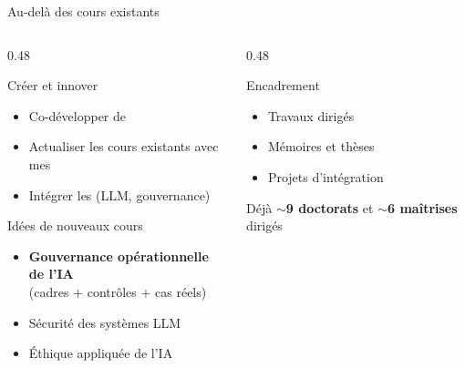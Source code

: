 \documentclass[aspectratio=169,11pt]{beamer}
\begin{document}
\begin{frame}{Au-delà des cours existants}
  \begin{columns}[T]
    \begin{column}{0.48\textwidth}
      \begin{block}{Créer et innover}
        \begin{itemize}
          \item Co-développer de 
          \item Actualiser les cours existants avec mes 
          \item Intégrer les  (LLM, gouvernance)
        \end{itemize}
      \end{block}
      
      \vspace{0.3em}
      
      \begin{exampleblock}{Idées de nouveaux cours}
        \small
        \begin{itemize}
          \item \textbf{Gouvernance opérationnelle de l'IA}\\
                {\scriptsize (cadres + contrôles + cas réels)}
          \item Sécurité des systèmes LLM
          \item Éthique appliquée de l'IA
        \end{itemize}
      \end{exampleblock}
    \end{column}
    \begin{column}{0.48\textwidth}
      \begin{alertblock}{Encadrement}
        \begin{itemize}
          \item Travaux dirigés
          \item Mémoires et thèses
          \item Projets d'intégration
        \end{itemize}
        
        \vspace{0.3em}
        
        {\small Déjà $\sim$\textbf{9 doctorats} et $\sim$\textbf{6 maîtrises} dirigés}
      \end{alertblock}
      

\end{column}
\end{columns}
\end{frame}
\end{document}

